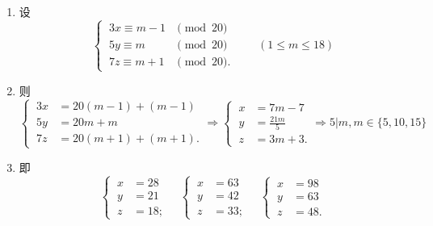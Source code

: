 \documentclass[UTF8]{ctexart}
\begin{document}
\subsection{}   %
\begin{enumerate}
    \item []设
    \[
        \begin{cases}
            \ 3x\equiv m-1 &\pmod{20}\\
            \ 5y\equiv m &\pmod{20}\\
            \ 7z\equiv m+1 &\pmod{20}.
        \end{cases}
        \qquad (1\leq m \leq 18)
    \]    
    \item []则
    \[
        \begin{cases}
            \ 3x&=20(m-1)+(m-1)\\
            \ 5y&=20m+m\\
            \ 7z&=20(m+1)+(m+1).
        \end{cases}
        \Rightarrow
        \begin{cases}
            \ x&=7m-7\\
            \ y&=\displaystyle{\frac{21m}{5}}\\
            \ z&=3m+3.
        \end{cases}
        \Rightarrow
        5|m,m\in\{5,10,15\}
    \]
    \item []即
    \[
        \begin{cases}
            \ x&=28\\
            \ y&=21\\
            \ z&=18;
        \end{cases}
        \quad
        \begin{cases}
            \ x&=63\\
            \ y&=42\\
            \ z&=33;
        \end{cases}
        \quad
        \begin{cases}
            \ x&=98\\
            \ y&=63\\
            \ z&=48.
        \end{cases}
    \]
    
\end{enumerate}
\end{document}
